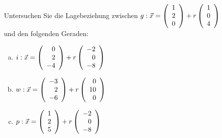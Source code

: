 \begin{aufgabe} ~ \\ 
Untersuchen Sie die Lagebeziehung zwischen $g: \vec{x}=\Vekd{1}{2}{0} + r\Vekd{1}{0}{4}$\\ und den folgenden Geraden:\begin{enumerate}[a)] 
\item 
$i: \vec{x}=\Vekd{0}{2}{-4} + r\Vekd{-2}{0}{-8}$
\item 
$w: \vec{x}=\Vekd{-3}{2}{-6} + r\Vekd{0}{10}{0}$
\item 
$p: \vec{x}=\Vekd{1}{2}{5} + r\Vekd{-2}{0}{-8}$
\end{enumerate} 
\end{aufgabe} 
